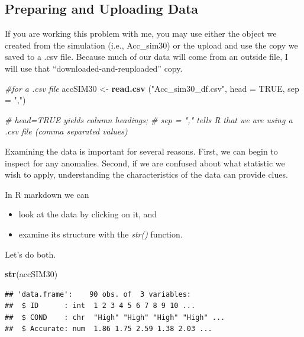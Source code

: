 \documentclass[
  english,
]{book}
\newenvironment{Shaded}{\begin{snugshade}}{\end{snugshade}}
\newcommand{\CommentTok}[1]{\textcolor[rgb]{0.56,0.35,0.01}{\textit{#1}}}
\newcommand{\DataTypeTok}[1]{\textcolor[rgb]{0.13,0.29,0.53}{#1}}
\newcommand{\KeywordTok}[1]{\textcolor[rgb]{0.13,0.29,0.53}{\textbf{#1}}}
\newcommand{\NormalTok}[1]{#1}
\newcommand{\OtherTok}[1]{\textcolor[rgb]{0.56,0.35,0.01}{#1}}
\newcommand{\StringTok}[1]{\textcolor[rgb]{0.31,0.60,0.02}{#1}}
\providecommand{\tightlist}{%
  \setlength{\itemsep}{0pt}\setlength{\parskip}{0pt}}
\begin{document}
\hypertarget{preparing-and-uploading-data}{%
\subsection{Preparing and Uploading Data}\label{preparing-and-uploading-data}}

If you are working this problem with me, you may use either the object we created from the simulation (i.e., Acc\_sim30) or the upload and use the copy we saved to a .csv file. Because much of our data will come from an outside file, I will use that ``downloaded-and-reuploaded'' copy.

\begin{Shaded}
\begin{Highlighting}[]
\CommentTok{#for a .csv file}
\NormalTok{accSIM30 <-}\StringTok{ }\KeywordTok{read.csv}\NormalTok{ (}\StringTok{"Acc_sim30_df.csv"}\NormalTok{, }\DataTypeTok{head =} \OtherTok{TRUE}\NormalTok{, }\DataTypeTok{sep =} \StringTok{","}\NormalTok{)}

\CommentTok{# head=TRUE yields column headings;}
\CommentTok{# sep = "," tells R that we are using a .csv file (comma separated values)}
\end{Highlighting}
\end{Shaded}

Examining the data is important for several reasons. First, we can begin to inspect for any anomalies. Second, if we are confused about what statistic we wish to apply, understanding the characteristics of the data can provide clues.

In R markdown we can

\begin{itemize}
\tightlist
\item
  look at the data by clicking on it, and
\item
  examine its structure with the \emph{str()} function.
\end{itemize}

Let's do both.

\begin{Shaded}
\begin{Highlighting}[]
\KeywordTok{str}\NormalTok{(accSIM30)}
\end{Highlighting}
\end{Shaded}

\begin{verbatim}
## 'data.frame':    90 obs. of  3 variables:
##  $ ID      : int  1 2 3 4 5 6 7 8 9 10 ...
##  $ COND    : chr  "High" "High" "High" "High" ...
##  $ Accurate: num  1.86 1.75 2.59 1.38 2.03 ...
\end{verbatim}
\end{document}
